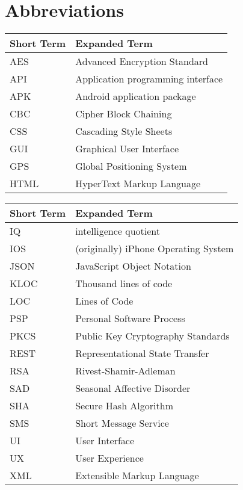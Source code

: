 \chapter{Abbreviations}

\begin{tabular}{p{40mm}|p{100mm}}
	\textbf{Short Term}&\textbf{Expanded Term}\\
	\hline
	
	AES		& Advanced Encryption Standard\\	
	API		& Application programming interface\\
	APK		& Android application package\\
	
	CBC 		& Cipher Block Chaining\\	
	CSS 		& Cascading Style Sheets\\
	
	GUI		& Graphical User Interface\\
	GPS		& Global Positioning System\\
	
	HTML 	& HyperText Markup Language\\


\end{tabular}

\begin{tabular}{p{40mm}|p{100mm}}
	\textbf{Short Term}&\textbf{Expanded Term}\\
	\hline

	IQ			& intelligence quotient\\
	IOS 		& (originally) iPhone Operating System\\
	
	JSON 	& JavaScript Object Notation\\

	KLOC	&	Thousand lines of code\\
	
	LOC		&	Lines of Code\\

	PSP		& 	Personal Software Process\\	
	PKCS 	& Public Key Cryptography Standards\\
	
	REST		& Representational State Transfer\\
	RSA		& Rivest-Shamir-Adleman\\
	
	SAD 		& Seasonal Affective Disorder\\
	SHA 		& Secure Hash Algorithm\\
	SMS 		& Short Message Service\\
	
	UI			& User Interface\\
	UX 		& User Experience\\	
	
	XML		& Extensible Markup Language\\

\end{tabular}